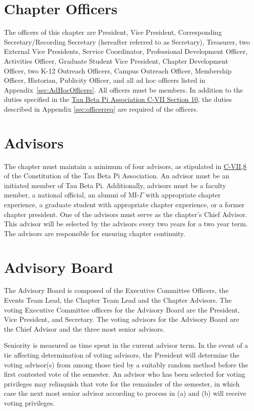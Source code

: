 \section{Chapter Officers}
The officers of this chapter are President, Vice President, Corresponding Secretary/Recording Secretary (hereafter referred to as Secretary), Treasurer, two External Vice Presidents, Service Coordinator, Professional Development Officer, Activities Officer, Graduate Student Vice President, Chapter Development Officer, two K-12 Outreach Officers, Campus Outreach Officer, Membership Officer, Historian, Publicity Officer, and all ad hoc officers listed in Appendix~\ref{sec:AdHocOfficers}.
All officers must be members.
In addition to the duties specified in the \href{http://www.tbp.org/off/ConstBylaw.pdf}{Tau Beta Pi Association C-VII Section 10}, the duties described in Appendix \ref{sec:officerreq} are required of the officers.

\section{Advisors}\label{sec:advisors}
The chapter must maintain a minimum of four advisors, as stipulated in \href{http://www.tbp.org/off/ConstBylaw.pdf}{C-VII,8} of the Constitution of the Tau Beta Pi Association.
An advisor must be an initiated member of Tau Beta Pi.
Additionally, advisors must be a faculty member, a national official, an alumni of MI-$\Gamma$ with appropriate chapter experience, a graduate student with appropriate chapter experience, or a former chapter president.
One of the advisors must serve as the chapter's Chief Advisor.
This advisor will be selected by the advisors every two years for a two year term.
The advisors are responsible for ensuring chapter continuity.


\section{Advisory Board}\label{sec:advbrd}
The Advisory Board is composed of the Executive Committee Officers, the Events Team Lead, the Chapter Team Lead and the Chapter Advisors.
The voting Executive Committee officers for the Advisory Board are the President, Vice President, and Secretary.
The voting advisors for the Advisory Board are the Chief Advisor and the three most senior advisors.

\begin{enumsubsection}
\itemnotoc Seniority is measured as time spent in the current advisor term.
\itemnotoc In the event of a tie affecting determination of voting advisors, the President will determine the voting advisor(s) from among those tied by a suitably random method before the first contested vote of the semester.
\itemnotoc An advisor who has been selected for voting privileges may relinquish that vote for the remainder of the semester, in which case the next most senior advisor according to process in (a) and (b) will receive voting privileges. 
\end{enumsubsection}

